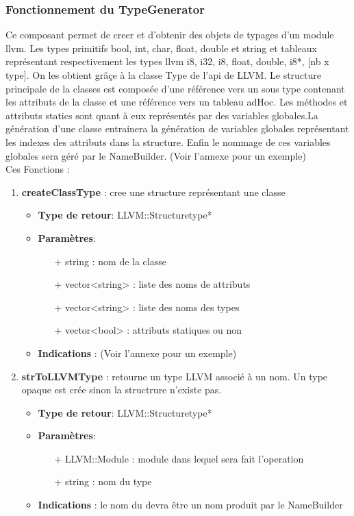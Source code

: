 \documentclass{article}
\begin{document}
   \subsubsection{Fonctionnement du TypeGenerator}
   Ce composant permet de creer et d'obtenir des objets de typages d'un module llvm.
   Les types primitifs bool, int, char, float, double et string et tableaux représentant respectivement les types 
   llvm i8, i32, i8, float, double, i8*, [nb x type]. On les obtient grâçe à la classe Type de l'api de LLVM.
   Le structure principale de la classes est composée d'une référence vers un sous type contenant les
   attributs de la classe et une référence vers un tableau adHoc. Les méthodes et attributs statics 
   sont quant à eux représentés par des variables globales.La génération d'une classe entrainera 
   la génération de variables globales représentant les indexes des attributs dans la structure.
   Enfin le nommage de ces variables globales sera géré par le NameBuilder.
    \small{(Voir l'annexe pour un exemple)} \\Ces Fonctions :\

   \begin{enumerate} 
    \item \textbf{createClassType} : cree une structure représentant une classe
   \begin{itemize}
     \item \textbf{Type de retour}: LLVM::Structuretype*
     \item \textbf{Paramètres}:
     \begin{enumerate}
       \item[+] string : nom de la classe
       \item[+] vector<string> : liste des noms de attributs
       \item[+] vector<string> : liste des noms des types
       \item[+] vector<bool> : attributs statiques ou non
     \end{enumerate}
     \item \textbf{Indications} : \small{(Voir l'annexe pour un exemple)}
   \end{itemize}

    \item \textbf{strToLLVMType} : retourne un type LLVM associé à un nom. Un type opaque est crée sinon la structrure n'existe pas.
   \begin{itemize}
     \item \textbf{Type de retour}: LLVM::Structuretype*
     \item \textbf{Paramètres}:
     \begin{enumerate}
       \item[+] LLVM::Module : module dans lequel sera fait l'operation
       \item[+] string : nom du type
     \end{enumerate}
     \item \textbf{Indications} : le nom du devra être un nom produit par le NameBuilder
   \end{itemize}

   \end{enumerate}
\end{document}
